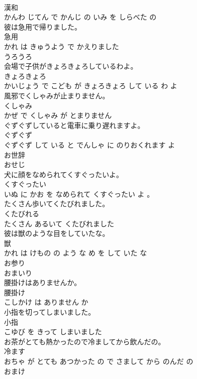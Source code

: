 \documentclass[8pt]{extreport}
\begin{document}
\begin{CJK}{UTF8}{min}
\\	漢和 
\\	かんわ じてん で かんじ の いみ を しらべた の			
\\	彼は急用で帰りました。	
\\	急用 
\\	かれ は きゅうよう で かえりました			
\\	うろうろ	
\\	会場で子供がきょろきょろしているわよ。	
\\	きょろきょろ 
\\	かいじょう で こども が きょろきょろ して いる わ よ			
\\	風邪でくしゃみが止まりません。	
\\	くしゃみ 
\\	かぜ で くしゃみ が とまりません			
\\	ぐずぐずしていると電車に乗り遅れますよ。	
\\	ぐずぐず 
\\	ぐずぐず して いる と でんしゃ に のりおくれます よ			
\\	お世辞	
\\	おせじ			
\\	犬に顔をなめられてくすぐったいよ。	
\\	くすぐったい 
\\	いぬ に かお を なめられて くすぐったい よ 。			
\\	たくさん歩いてくたびれました。	
\\	くたびれる 
\\	たくさん あるいて くたびれました			
\\	彼は獣のような目をしていたな。	
\\	獣 
\\	かれ は けもの の よう な め を して いた な			
\\	お参り	
\\	おまいり			
\\	腰掛けはありませんか。	
\\	腰掛け 
\\	こしかけ は ありません か			
\\	小指を切ってしまいました。	
\\	小指 
\\	こゆび を きって しまいました			
\\	お茶がとても熱かったので冷ましてから飲んだの。	
\\	冷ます 
\\	おちゃ が とても あつかった の で さまして から のんだ の			
\\	おまけ	

\end{CJK}
\end{document}
